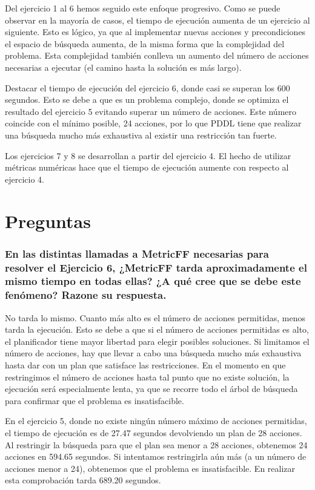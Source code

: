\documentclass[12pt]{article} %
\begin{document}
Del ejercicio 1 al 6 hemos seguido este enfoque progresivo. Como se puede observar en la mayoría de casos, el tiempo de ejecución aumenta de un ejercicio al siguiente. Esto es lógico, ya que al implementar nuevas acciones y precondiciones el espacio de búsqueda aumenta, de la misma forma que la complejidad del problema. Esta complejidad también conlleva un aumento del número de acciones necesarias a ejecutar (el camino hasta la solución es más largo).

Destacar el tiempo de ejecución del ejercicio 6, donde casi se superan los 600 segundos. Esto se debe a que es un problema complejo, donde se optimiza el resultado del ejercicio 5 evitando superar un número de acciones. Este número coincide con el mínimo posible, 24 acciones, por lo que PDDL tiene que realizar una búsqueda mucho más exhaustiva al existir una restricción tan fuerte.

Los ejercicios 7 y 8 se desarrollan a partir del ejercicio 4. El hecho de utilizar métricas numéricas hace que el tiempo de ejecución aumente con respecto al ejercicio 4.

\section{Preguntas}
\subsubsection*{En las distintas llamadas a MetricFF necesarias para resolver el Ejercicio 6, ¿MetricFF tarda aproximadamente el mismo tiempo en todas ellas? ¿A qué cree que se debe este fenómeno? Razone su respuesta.}

No tarda lo mismo. Cuanto más alto es el número de acciones permitidas, menos tarda la ejecución. Esto se debe a que si el número de acciones permitidas es alto, el planificador tiene mayor libertad para elegir posibles soluciones. Si limitamos el número de acciones, hay que llevar a cabo una búsqueda mucho más exhaustiva hasta dar con un plan que satisface las restricciones. En el momento en que restringimos el número de acciones hasta tal punto que no existe solución, la ejecución será especialmente lenta, ya que se recorre todo el árbol de búsqueda para confirmar que el problema es insatisfacible. 

En el ejercicio 5, donde no existe ningún número máximo de acciones permitidas, el tiempo de ejecución es de 27.47 segundos devolviendo un plan de 28 acciones. Al restringir la búsqueda para que el plan sea menor a 28 acciones, obtenemos 24 acciones en 594.65 segundos. Si intentamos restringirla aún más (a un número de acciones menor a 24), obtenemos que el problema es insatisfacible. En realizar esta comprobación tarda 689.20 segundos.
\end{document}
